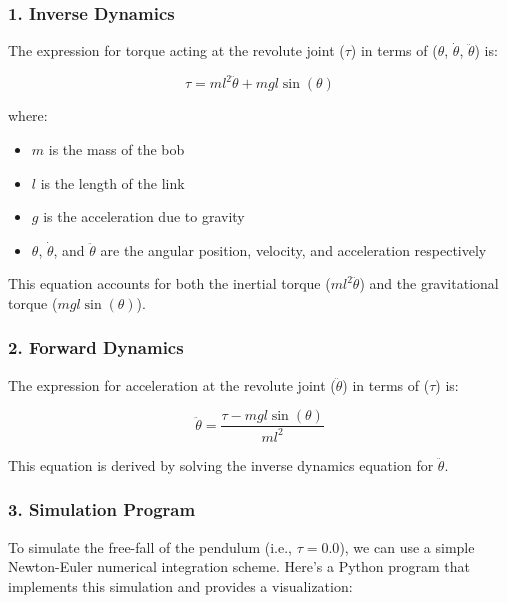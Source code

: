 \begin{solution}

\subsubsection*{1. Inverse Dynamics}

The expression for torque acting at the revolute joint ($\tau$) in terms of ($\theta$, $\dot{\theta}$, $\ddot{\theta}$) is:

\begin{equation}
    \tau = ml^2\ddot{\theta} + mgl\sin(\theta)
\end{equation}

where:
\begin{itemize}
    \item $m$ is the mass of the bob
    \item $l$ is the length of the link
    \item $g$ is the acceleration due to gravity
    \item $\theta$, $\dot{\theta}$, and $\ddot{\theta}$ are the angular position, velocity, and acceleration respectively
\end{itemize}

This equation accounts for both the inertial torque ($ml^2\ddot{\theta}$) and the gravitational torque ($mgl\sin(\theta)$).

\subsubsection*{2. Forward Dynamics}

The expression for acceleration at the revolute joint ($\ddot{\theta}$) in terms of ($\tau$) is:

\begin{equation}
    \ddot{\theta} = \frac{\tau - mgl\sin(\theta)}{ml^2}
\end{equation}

This equation is derived by solving the inverse dynamics equation for $\ddot{\theta}$.

\subsubsection*{3. Simulation Program}

To simulate the free-fall of the pendulum (i.e., $\tau = 0.0$), we can use a simple Newton-Euler numerical integration scheme. Here's a Python program that implements this simulation and provides a visualization:


\end{solution}
